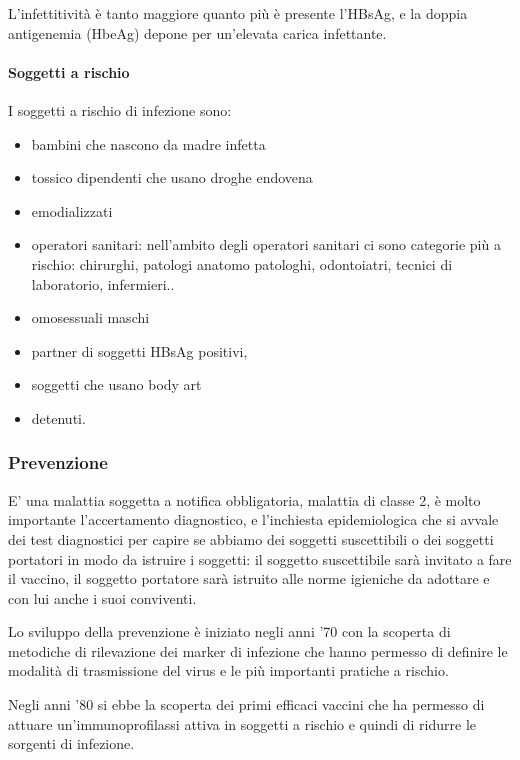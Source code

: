   L'infettitività è tanto maggiore quanto più è presente l'HBsAg, e la
  doppia antigenemia (HbeAg) depone per un'elevata carica infettante.

\paragraph{Soggetti a rischio}

  I soggetti a rischio di infezione sono:

\begin{itemize}
\item
  bambini che nascono da madre infetta
\item
  tossico dipendenti che usano droghe endovena
\item
  emodializzati
\item
  operatori sanitari: nell'ambito degli operatori sanitari ci sono
  categorie più a rischio: chirurghi, patologi anatomo patologhi,
  odontoiatri, tecnici di laboratorio, infermieri..
\item
  omosessuali maschi
\item
  partner di soggetti HBsAg positivi,
\item
  soggetti che usano body art
\item
  detenuti.
\end{itemize}

\subsubsection{Prevenzione}

  E' una malattia soggetta a notifica obbligatoria, malattia di classe
  2, è molto importante l'accertamento diagnostico, e l'inchiesta
  epidemiologica che si avvale dei test diagnostici per capire se
  abbiamo dei soggetti suscettibili o dei soggetti portatori in modo da
  istruire i soggetti: il soggetto suscettibile sarà invitato a fare il
  vaccino, il soggetto portatore sarà istruito alle norme igieniche da
  adottare e con lui anche i suoi conviventi.

  Lo sviluppo della prevenzione è iniziato negli anni '70 con la
  scoperta di metodiche di rilevazione dei marker di infezione che hanno
  permesso di definire le modalità di trasmissione del virus e le più
  importanti pratiche a rischio.

  Negli anni '80 si ebbe la scoperta dei primi efficaci vaccini che ha
  permesso di attuare un'immunoprofilassi attiva in soggetti a rischio e
  quindi di ridurre le sorgenti di infezione.

